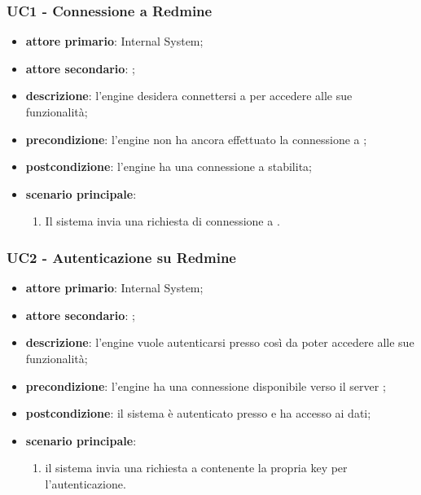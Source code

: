 \subsubsection{UC1 - Connessione a Redmine}
\begin{itemize}
	\item \textbf{attore primario}: Internal System;
	\item \textbf{attore secondario}: ;
	\item \textbf{descrizione}: l'engine desidera connettersi a  per accedere alle sue funzionalità;
	\item \textbf{precondizione}: l'engine non ha ancora effettuato la connessione a ;
	\item \textbf{postcondizione}: l'engine ha una connessione a  stabilita;
	\item \textbf{scenario principale}: 
	\begin{enumerate}
		\item Il sistema invia una richiesta di connessione a .
	\end{enumerate}
\end{itemize}

\subsubsection{UC2 - Autenticazione su Redmine}
\begin{itemize}
	\item \textbf{attore primario}: Internal System;
	\item \textbf{attore secondario}: ;
	\item \textbf{descrizione}: l'engine vuole autenticarsi presso  così da poter accedere alle sue funzionalità;
	\item \textbf{precondizione}: l'engine ha una connessione disponibile verso il server ;
	\item \textbf{postcondizione}: il sistema è autenticato presso  e ha accesso ai dati;
	\item \textbf{scenario principale}: 
	\begin{enumerate}
		\item il sistema invia una richiesta a  contenente la propria   key per l'autenticazione.
	\end{enumerate}
\end{itemize}
